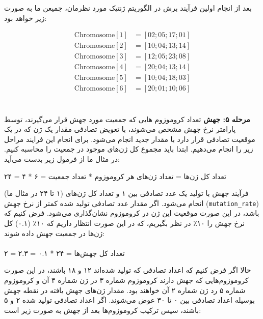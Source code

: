 \documentclass[11pt]{article}
\begin{document}
بعد از انجام اولین فرآیند برش در الگوریتم ژنتیک مورد نظرمان، جمیعن ما به صورت زیر خواهد بود:

\[
\begin{align*}
\text{Chromosome}[1] &= [02;05;17;01] \\
\text{Chromosome}[2] &= [10;04;13;14] \\
\text{Chromosome}[3] &= [12;05;23;08] \\
\text{Chromosome}[4] &= [20;04;13;14] \\
\text{Chromosome}[5] &= [10;04;18;03] \\
\text{Chromosome}[6] &= [20;01;10;06]
\end{align*}
\]
\\
\\

\textbf{مرحله ۵: جهش }
تعداد کروموزوم هایی که جمعیت مورد جهش قرار می‌گیرند، توسط پارامتر نرخ جهش مشخص می‌شوند، با تعویض تصادفی مقدار یک ژن که در یک موقعیت تصادفی قرار دارد با مقدار جدید انجام می‌شود. برای انجام این فرایند مراحل زیر را انجام می‌دهیم. ابتدا باید مجموع کل ژن‌های موجود در جمعیت را محاسبه کنیم. در مثال ما از فرمول زیر بدست می‌آید:

تعداد کل ژن‌ها = تعداد ژن‌های هر کروموزوم * تعداد جمعیت = ۶ * ۴ = ۲۴

فرآیند جهش با تولید یک عدد تصادفی بین ۱ و تعداد کل ژن‌های (۱ تا ۲۴ در مثال ما) انجام می‌شود. اگر مقدار عدد تصادفی تولید شده کمتر از نرخ جهش (\texttt{mutation\_rate}) باشد، در این صورت موقعیت این ژن در کروموزوم نشان‌گذاری می‌شود. فرض کنیم که نرخ جهش را ۱۰٪ در نظر بگیریم، که در این صورت انتظار داریم که ۱۰٪ (۰.۱) کل ژن‌ها در جمعیت جهش داده شوند:
\\
\\
تعداد کل جهش‌ها = ۲۴ * ۰.۱ = ۲.۳ = ۲

حالا اگر فرض کنیم که اعداد تصادفی که تولید شده‌اند ۱۲ و ۱۸ باشند، در این صورت کروموزوم‌هایی که جهش دارند کروموزوم شماره ۳ در ژن شماره ۴ آن و کروموزوم شماره ۵ رد ژن شماره ۲ آن خواهند بود. مقدار ژن‌های جهش یافته در نقطه جهش بوسیله اعداد تصادفی بین ۰ تا ۳۰ عوض می‌شوند. اگر اعداد تصادفی تولید شده ۲ و ۵ باشند، سپس ترکیب کروموزوم‌ها بعد از جهش به صورت زیر است:
\end{document}
